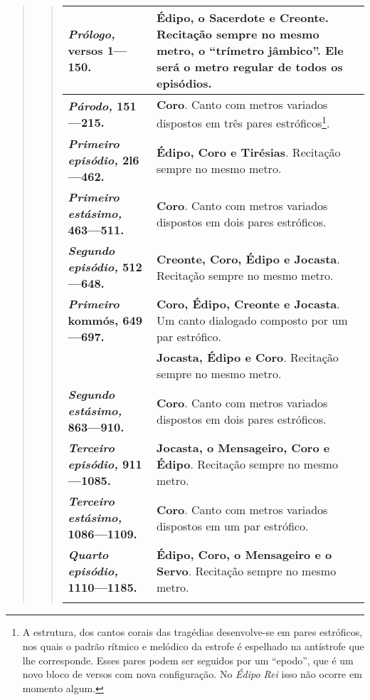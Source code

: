 \begin{verse}
\begin{verse}
\begin{table}[H]
    \begin{tabular}{|l|l|}
    \hline
    \textbf{\emph{Prólogo,} versos 1---150.}                    & \textbf{Édipo, o Sacerdote e Creonte}. Recitação sempre no mesmo metro, o ``trímetro jâmbico''. Ele será o metro regular de todos os episódios. \\ \hline
    \textbf{\emph{Párodo,} 151---215.}                          & \textbf{Coro}. Canto com metros variados dispostos em três pares estróficos\footnote{ A estrutura, dos cantos corais das tragédias desenvolve-se em pares estróficos, nos quais o padrão rítmico e melódico da estrofe é espelhado na antístrofe que lhe corresponde. Esses pares podem ser seguidos por um ``epodo'', que é um novo bloco de versos com nova configuração. No \emph{Édipo Rei} isso não ocorre em momento algum.}. \\ \hline
    \textbf{\emph{Primeiro episódio,} 2l6---462.}               & \textbf{Édipo, Coro e Tirésias}. Recitação sempre no mesmo metro. \\ \hline
    \textbf{\emph{Primeiro estásimo,} 463---511.}               & \textbf{Coro}. Canto com metros variados dispostos em dois pares estróficos. \\ \hline
    \textbf{\emph{Segundo episódio,} 512---648.}                & \textbf{Creonte, Coro, Édipo e Jocasta}. Recitação sempre no mesmo metro.  \\ \hline
    \textbf{\emph{Primeiro} kommós, 649---697.}       & \textbf{Coro, Édipo, Creonte e Jocasta}. Um canto dialogado composto por um par estrófico. \\ \hline
    \textbf{Continuação do \emph{segundo episódio,} 698---862.\} & \textbf{Jocasta, Édipo e Coro}. Recitação sempre no mesmo metro. \\ \hline
    \textbf{\emph{Segundo estásimo,} 863---910.}                & \textbf{Coro}. Canto com metros variados dispostos em dois pares estróficos. \\ \hline
    \textbf{\emph{Terceiro episódio,} 911---1085.}              & \textbf{Jocasta, o Mensageiro, Coro e Édipo}. Recitação sempre no mesmo metro. \\ \hline
    \textbf{\emph{Terceiro estásimo,} 1086---1109.}             & \textbf{Coro}. Canto com metros variados dispostos em um par estrófico. \\ \hline
    \textbf{\emph{Quarto episódio,} 1110---1185.}               & \textbf{Édipo, Coro, o Mensageiro e o Servo}. Recitação sempre no mesmo metro. \\ \hline
}
\end{tabular}
\end{table}
\end{verse}
\end{verse}
